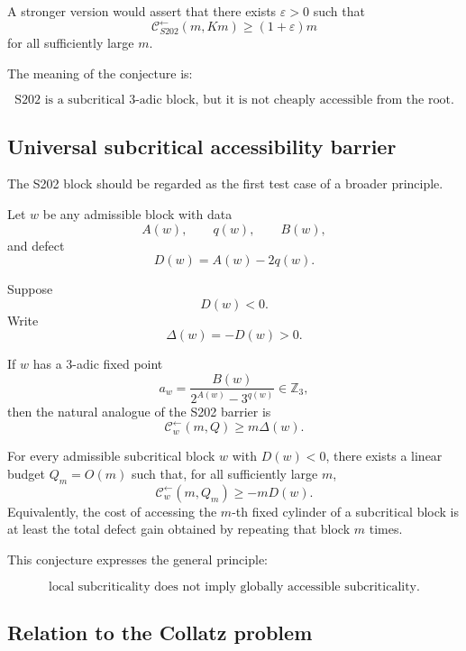 A stronger version would assert that there exists \(\varepsilon>0\) such
that
\[
\mathcal C^{\leftarrow}_{S202}(m,Km)
\ge
(1+\varepsilon)m
\]
for all sufficiently large \(m\).

The meaning of the conjecture is:

\[
\boxed{
\text{S202 is a subcritical }3\text{-adic block, but it is not cheaply
accessible from the root.}
}
\]

\subsection{Universal subcritical accessibility barrier}
\label{subsec:universal-subcritical-barrier}

The S202 block should be regarded as the first test case of a broader
principle.

Let \(w\) be any admissible block with data
\[
A(w),\qquad q(w),\qquad B(w),
\]
and defect
\[
D(w)=A(w)-2q(w).
\]

Suppose
\[
D(w)<0.
\]
Write
\[
\Delta(w)=-D(w)>0.
\]

If \(w\) has a \(3\)-adic fixed point
\[
a_w=
\frac{B(w)}{2^{A(w)}-3^{q(w)}}\in\mathbb Z_3,
\]
then the natural analogue of the S202 barrier is
\[
\mathcal C^{\leftarrow}_{w}(m,Q)
\ge
m\Delta(w).
\]

\begin{conjecture}
\label{conj:universal-subcritical-barrier}
For every admissible subcritical block \(w\) with \(D(w)<0\), there exists a
linear budget \(Q_m=O(m)\) such that, for all sufficiently large \(m\),
\[
\mathcal C^{\leftarrow}_{w}(m,Q_m)
\ge
-mD(w).
\]
Equivalently, the cost of accessing the \(m\)-th fixed cylinder of a
subcritical block is at least the total defect gain obtained by repeating
that block \(m\) times.
\end{conjecture}

This conjecture expresses the general principle:

\[
\boxed{
\text{local subcriticality does not imply globally accessible
subcriticality.}
}
\]

\subsection{Relation to the Collatz problem}
\label{subsec:relation-to-collatz}

